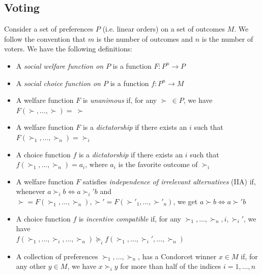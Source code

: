 \documentclass[12pt]{article}
\newcommand{\1}[1]{\mathds{1}[{#1}]}
\begin{document}
  \subsection{Voting}
    Consider a set of preferences $P$ (i.e. linear orders) on a
    set of outcomes $M$.
    We follow the convention that $m$ is the number of outcomes and $n$
    is the number of voters.
    We have the following definitions:
    \begin{itemize}
      \item A \emph{social welfare function on $P$}
        is a function $F : P^n \to P$
      \item A \emph{social choice function on $P$}
        is a function $f : P^n \to M$
      \item A welfare function $F$ is \emph{unanimous} if,
        for any $\succ\ \in P$, we have $F(\succ,\ldots,\succ) =\ \succ$
      \item A welfare function $F$ is a \emph{dictatorship} if
        there exists an $i$ such that $F(\succ_1,\ldots,\succ_n) = \succ_i$
      \item A choice function $f$ is a \emph{dictatorship} if
        there exists an $i$ such that $f(\succ_1,\ldots,\succ_n) = a_i$,
        where $a_i$ is the favorite outcome of $\succ_i$
      \item A welfare function $F$ satisfies \emph{independence of
        irrelevant alternatives} (IIA) if, whenever $a\succ_i b \iff a\succ_i' b$
        and $\succ = F(\succ_1,\ldots,\succ_n),
        \succ' = F(\succ'_1,\ldots,\succ'_n)$,
        we get $a\succ b \iff a\succ' b$
      \item A choice function $f$ is \emph{incentive compatible} if,
        for any $\succ_1,\ldots,\succ_n, i, \succ_i'$, we have \\
        $f(\succ_1,\ldots,\succ_i,\ldots,\succ_n) 
        \succeq_i f(\succ_1,\ldots,\succ_i',\ldots,\succ_n)$
      \item A collection of preferences $\succ_1,\ldots,\succ_n$,
        has a Condorcet winner $x \in M$ if, for any other $y\in M$,
        we have $x \succ_i y$ for more than half of the indices
        $i=1,\ldots,n$
    \end{itemize}
\end{document}
